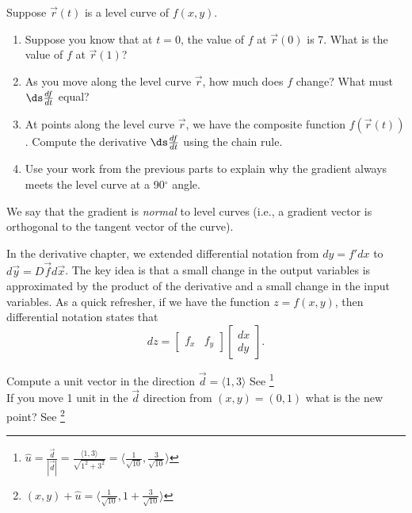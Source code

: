 \begin{problem}
 Suppose $\vec r(t)$ is a level curve of $f(x,y)$.  
\begin{enumerate}
 \item Suppose you know that at $t=0$, the value of $f$ at $\vec r(0)$ is 7.  What is the value of $f$ at $\vec r(1)$?
 \item As you move along the level curve $\vec r$, how much does $f$ change?  What must $\ds\frac{df}{dt}$ equal?
 \item At points along the level curve $\vec r$, we have the composite function $f(\vec r(t))$.  Compute the derivative $\ds\frac{df}{dt}$ using the chain rule.
 \item Use your work from the previous parts to explain why the gradient always meets the level curve at a 90$^\circ$ angle.  
\end{enumerate}
We say that the gradient is \emph{normal} to level curves (i.e., a gradient vector is orthogonal to the tangent vector of the curve).
\end{problem}

\newpage

In the derivative chapter, we extended differential notation from $dy=f' dx$ to $d\vec y = D\vec f d\vec x$. The key idea is that a small change in the output variables is approximated by the product of the derivative and a small change in the input variables. As a quick refresher, if  we have the function $z=f(x,y)$, then differential notation states that $$dz = \begin{bmatrix}f_x&f_y\end{bmatrix} \begin{bmatrix}dx\\dy\end{bmatrix}.$$ 

\begin{review*}
Compute a unit vector in the direction $\vec{d}=\langle 1,3 \rangle$ See \footnote{ $\hat{u}=\frac{\vec{d}}{|\vec{d}|}=\frac{\langle 1,3 \rangle}{\sqrt{1^2+3^2}}=\langle \frac{1}{\sqrt{10}}, \frac{3}{\sqrt{10}} \rangle$}\\
If you move 1 unit in the $\vec{d}$ direction from $(x,y)=(0,1)$ what is the new point? See \footnote{$(x,y)+\hat{u}=\langle \frac{1}{\sqrt{10}}, 1+\frac{3}{\sqrt{10}} \rangle$}
\end{review*}

